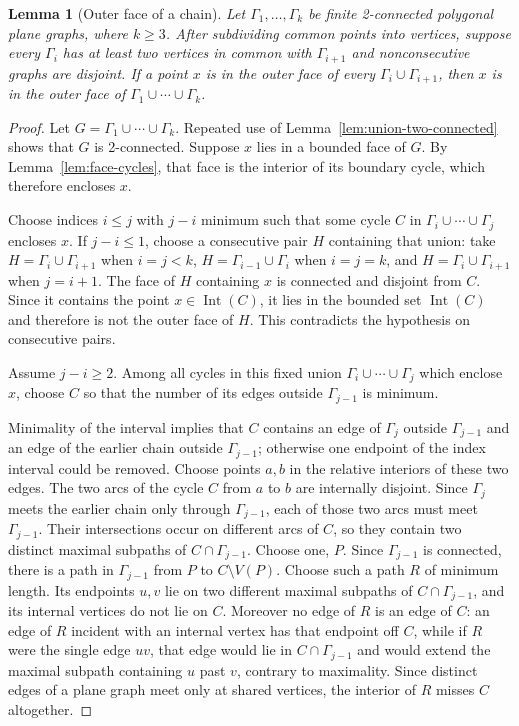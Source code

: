 \documentclass[11pt]{article}
\theoremstyle{mainplain}
\newtheorem{lemma}[theorem]{Lemma}
\theoremstyle{mainroman}
\theoremstyle{definition}
\numberwithin{equation}{section}
\begin{document}
\begin{lemma}[Outer face of a chain]\label{lem:outer-chain}
Let $\Gamma_1,\ldots,\Gamma_k$ be finite 2-connected polygonal plane
graphs, where $k\ge3$. After subdividing common points into vertices,
suppose every $\Gamma_i$ has at least two vertices in common with
$\Gamma_{i+1}$ and nonconsecutive graphs are disjoint. If a point $x$
is in the outer
face of every $\Gamma_i\cup\Gamma_{i+1}$, then $x$ is in the outer
face of $\Gamma_1\cup\cdots\cup\Gamma_k$.
\end{lemma}
\begin{proof}
Let $G=\Gamma_1\cup\cdots\cup\Gamma_k$. Repeated use of
Lemma~\ref{lem:union-two-connected} shows that $G$ is 2-connected. Suppose
$x$ lies in a bounded face of $G$. By Lemma~\ref{lem:face-cycles}, that
face is the interior of its boundary cycle, which therefore encloses
$x$.

Choose indices $i\le j$ with $j-i$ minimum such that some cycle $C$
in \(\Gamma_i\cup\cdots\cup\Gamma_j\) encloses $x$. If $j-i\le1$,
choose a consecutive pair $H$ containing that union: take
$H=\Gamma_i\cup\Gamma_{i+1}$ when $i=j<k$,
$H=\Gamma_{i-1}\cup\Gamma_i$ when $i=j=k$, and
$H=\Gamma_i\cup\Gamma_{i+1}$ when $j=i+1$. The face of $H$ containing
$x$ is connected and disjoint from $C$. Since it contains the point
$x\in\operatorname{Int}(C)$, it lies in the bounded set
$\operatorname{Int}(C)$ and therefore is not the outer face of $H$.
This contradicts the hypothesis on consecutive pairs.

Assume $j-i\ge2$. Among all cycles in this fixed union
\(\Gamma_i\cup\cdots\cup\Gamma_j\) which enclose $x$, choose $C$ so
that the number of its edges outside $\Gamma_{j-1}$ is minimum.

Minimality of the interval implies that $C$ contains an edge of
$\Gamma_j$ outside $\Gamma_{j-1}$ and an edge of the earlier chain
outside $\Gamma_{j-1}$; otherwise one endpoint of the index interval
could be removed. Choose points $a,b$ in the relative interiors of
these two edges. The two arcs of the cycle $C$ from $a$ to $b$ are
internally disjoint. Since $\Gamma_j$ meets the earlier chain only
through $\Gamma_{j-1}$, each of those two arcs must meet
$\Gamma_{j-1}$. Their intersections occur on different arcs of $C$,
so they contain two distinct maximal subpaths of
$C\cap\Gamma_{j-1}$. Choose one, $P$. Since $\Gamma_{j-1}$ is connected,
there is a path in $\Gamma_{j-1}$ from $P$ to
$C\setminus V(P)$. Choose such a path $R$ of minimum length. Its
endpoints $u,v$ lie on two different maximal subpaths of
$C\cap\Gamma_{j-1}$, and its internal vertices do not lie on $C$.
Moreover no edge of $R$ is an edge of $C$: an edge of $R$ incident
with an internal vertex has that endpoint off $C$, while if $R$ were
the single edge $uv$, that edge would lie in $C\cap\Gamma_{j-1}$ and
would extend the maximal subpath containing $u$ past $v$, contrary to
maximality. Since distinct edges of a plane graph meet only at shared
vertices, the interior of $R$ misses $C$ altogether.


\end{proof}
\end{document}
